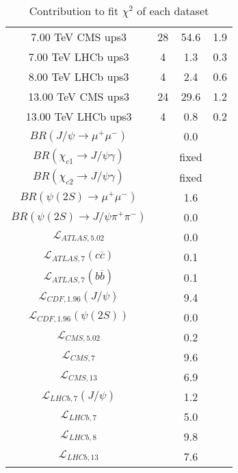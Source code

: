 \begin{table}[h!]
\begin{tabular}{c|c|c|c}
7.00 TeV CMS ups3 & 28 & 54.6 & 1.9 \\
7.00 TeV LHCb ups3 & 4 & 1.3 & 0.3 \\
8.00 TeV LHCb ups3 & 4 & 2.4 & 0.6 \\
13.00 TeV CMS ups3 & 24 & 29.6 & 1.2 \\
13.00 TeV LHCb ups3 & 4 & 0.8 & 0.2 \\
\hline
$BR(J/\psi\rightarrow\mu^+\mu^-)$ &  & 0.0 &  \\
$BR(\chi_{c1}\rightarrow J/\psi\gamma)$ &  & fixed & \\
$BR(\chi_{c2}\rightarrow J/\psi\gamma)$ &  & fixed & \\
$BR(\psi(2S)\rightarrow\mu^+\mu^-)$ &  & 1.6 &  \\
$BR(\psi(2S)\rightarrow J/\psi\pi^+\pi^-)$ &  & 0.0 &  \\
$\mathcal L_{ATLAS,5.02}$ &  & 0.0 &  \\
$\mathcal L_{ATLAS,7}(c\overline c)$ &  & 0.1 &  \\
$\mathcal L_{ATLAS,7}(b\overline b)$ &  & 0.1 &  \\
$\mathcal L_{CDF,1.96}(J/\psi)$ &  & 9.4 &  \\
$\mathcal L_{CDF,1.96}(\psi(2S))$ &  & 0.0 &  \\
$\mathcal L_{CMS,5.02}$ &  & 0.2 &  \\
$\mathcal L_{CMS,7}$ &  & 9.6 &  \\
$\mathcal L_{CMS,13}$ &  & 6.9 &  \\
$\mathcal L_{LHCb,7}(J/\psi)$ &  & 1.2 &  \\
$\mathcal L_{LHCb,7}$ &  & 5.0 &  \\
$\mathcal L_{LHCb,8}$ &  & 9.8 &  \\
$\mathcal L_{LHCb,13}$ &  & 7.6 &  \\
\end{tabular}
\caption{Contribution to fit $\chi^2$ of each dataset}
\end{table}
